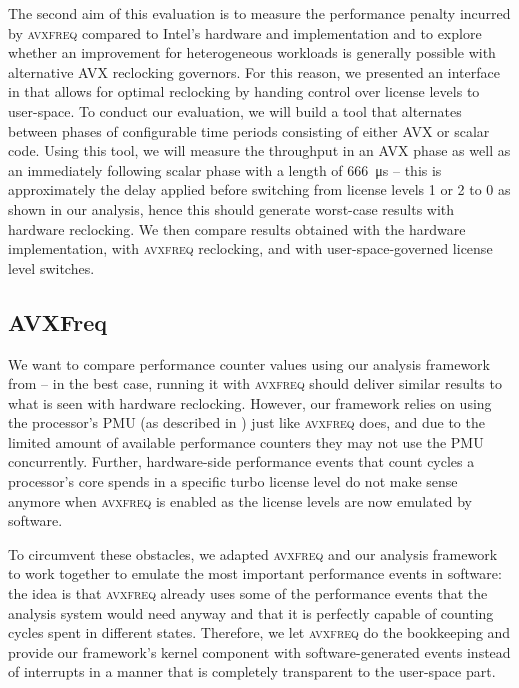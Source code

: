 The second aim of this evaluation is to measure the performance penalty incurred by \textsc{avxfreq} compared to Intel's hardware and implementation and to explore whether an improvement for heterogeneous workloads is generally possible with alternative \gls{AVX} reclocking governors. For this reason, we presented an interface in  that allows for optimal reclocking by handing control over license levels to user-space. To conduct our evaluation, we will build a tool that alternates between phases of configurable time periods consisting of either \gls{AVX} or scalar code. Using this tool, we will measure the throughput in an \gls{AVX} phase as well as an immediately following scalar phase with a length of \SI{666}{\micro\second} -- this is approximately the delay applied before switching from license levels 1 or 2 to 0 as shown in our analysis, hence this should generate worst-case results with hardware reclocking. We then compare results obtained with the hardware implementation, with \textsc{avxfreq} reclocking, and with user-space-governed license level switches.

\subsection{AVXFreq}
\label{sec:evaluation:design:avxfreq}

We want to compare performance counter values using our analysis framework from  -- in the best case, running it with \textsc{avxfreq} should deliver similar results to what is seen with hardware reclocking. However, our framework relies on using the processor's \gls{PMU} (as described in ) just like \textsc{avxfreq} does, and due to the limited amount of available performance counters they may not use the \gls{PMU} concurrently. Further, hardware-side performance events that count cycles a processor's core spends in a specific turbo license level do not make sense anymore when \textsc{avxfreq} is enabled as the license levels are now emulated by software.

To circumvent these obstacles, we adapted \textsc{avxfreq} and our analysis framework to work together to emulate the most important performance events in software: the idea is that \textsc{avxfreq} already uses some of the performance events that the analysis system would need anyway and that it is perfectly capable of counting cycles spent in different states. Therefore, we let \textsc{avxfreq} do the bookkeeping and provide our framework's kernel component with software-generated events instead of interrupts in a manner that is completely transparent to the user-space part.

